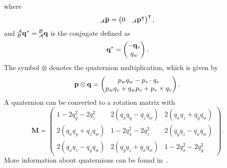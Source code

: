 where
\begin{equation}
    {}_\mathcal{A}\overline{\vb{p}} = \begin{pmatrix}
        0 & {}_\mathcal{A}\vb{p}^\intercal
    \end{pmatrix}^\intercal,
\end{equation}
and $\qtf{a}{b}^* = \qtf{b}{a}$ is the conjugate defined as
\begin{equation}
    \qtf{}{}^* = \begin{pmatrix}
        -\vb{q}_v \\
        q_w
    \end{pmatrix}.
\end{equation}
The symbol $\otimes$ denotes the quaternion multiplication, which is given by
\begin{equation}
    \vb{p} \otimes \vb{q} =
    \begin{pmatrix}
        p_{w} q_{w}-p_v \cdot q_v \\
        p_{w} q_v+q_{w} p_v+p_v \times q_v
    \end{pmatrix}.
\end{equation}
A quaternion can be converted to a rotation matrix with
\begin{equation}
    \label{eq:q_to_M}
    \mathbf{M} =
    \begin{pmatrix}
        1 - 2q_y^2-2 q_z^2   & 2(q_x q_y- q_z q_w) & 2(q_x q_z + q_y q_w) \\
        2(q_x q_y + q_z q_w) & 1-2 q_x^2-2 q_z^2   & 2(q_y q_z -q_x q_w)  \\
        2(q_x q_z-q_y q_w)   & 2(q_y q_z+ q_x q_w) & 1 - 2 q_x^2- 2 q_y^2
    \end{pmatrix}.
\end{equation}
More information about quaternions can be found in~\cite{Kok2017,Trawny2005}.\\

